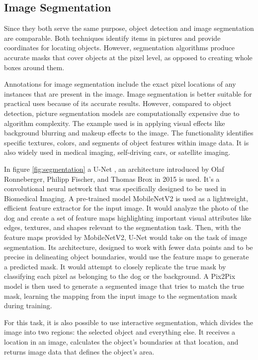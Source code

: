 \subsection*{Image Segmentation}

Since they both serve the same purpose, object detection and image segmentation are comparable. Both techniques identify items in pictures and provide coordinates for locating objects. However, segmentation algorithms produce accurate masks that cover objects at the pixel level, as opposed to creating whole boxes around them.

Annotations for image segmentation include the exact pixel locations of any instances that are present in the image. Image segmentation is better suitable for practical uses because of its accurate results. However, compared to object detection, picture segmentation models are computationally expensive due to algorithm complexity.
The example used is in applying visual effects like background blurring and makeup effects to the image. The functionality identifies specific textures, colors, and segments of object features within image data. It is also widely used in medical imaging, self-driving cars, or satellite imaging.

In figure \ref{fig:segmentation} a U-Net \cite{ronneberger2015u}, an architecture introduced by Olaf Ronneberger, Philipp Fischer, and Thomas Brox in 2015 is used. It's a convolutional neural network that was specifically designed to be used in Biomedical Imaging. A pre-trained model MobileNetV2 \cite{sandler2018mobilenetv2} is used as a lightweight, efficient feature extractor for the input image. It would analyze the photo of the dog and create a set of feature maps highlighting important visual attributes like edges, textures, and shapes relevant to the segmentation task. Then, with the feature maps provided by MobileNetV2, U-Net would take on the task of image segmentation. Its architecture, designed to work with fewer data points and to be precise in delineating object boundaries, would use the feature maps to generate a predicted mask. It would attempt to closely replicate the true mask by classifying each pixel as belonging to the dog or the background. A Pix2Pix \cite{isola2017image} model is then used to generate a segmented image that tries to match the true mask, learning the mapping from the input image to the segmentation mask during training.

For this task, it is also possible to use interactive segmentation, which divides the image into two regions: the selected object and everything else. It receives a location in an image, calculates the object's boundaries at that location, and returns image data that defines the object's area.




